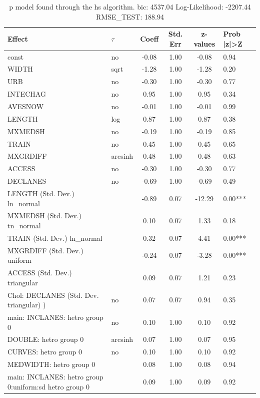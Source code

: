 \begin{table}
	\caption{p model found through the hs algorithm. bic: 4537.04 Log-Likelihood: -2207.44 RMSE_TEST: 188.94}
	\begin{center}
		\begin{tabular}{|l|l|c|c|c|l|}
			\hline
			Effect & $\tau$ & Coeff & Std. Err & z-values & Prob |z|>Z \\
			\hline
			const & no & -0.08 & 1.00 & -0.08 & 0.94 \\
			\hline
			WIDTH & sqrt & -1.28 & 1.00 & -1.28 & 0.20 \\
			\hline
			URB & no & -0.30 & 1.00 & -0.30 & 0.77 \\
			\hline
			INTECHAG & no & 0.95 & 1.00 & 0.95 & 0.34 \\
			\hline
			AVESNOW & no & -0.01 & 1.00 & -0.01 & 0.99 \\
			\hline
			LENGTH & log & 0.87 & 1.00 & 0.87 & 0.38 \\
			\hline
			MXMEDSH & no & -0.19 & 1.00 & -0.19 & 0.85 \\
			\hline
			TRAIN & no & 0.45 & 1.00 & 0.45 & 0.65 \\
			\hline
			MXGRDIFF & arcsinh & 0.48 & 1.00 & 0.48 & 0.63 \\
			\hline
			ACCESS & no & -0.30 & 1.00 & -0.30 & 0.77 \\
			\hline
			DECLANES & no & -0.69 & 1.00 & -0.69 & 0.49 \\
			\hline
			LENGTH (Std. Dev.) ln_normal &  & -0.89 & 0.07 & -12.29 & 0.00*** \\
			\hline
			MXMEDSH (Std. Dev.) tn_normal &  & 0.10 & 0.07 & 1.33 & 0.18 \\
			\hline
			TRAIN (Std. Dev.) ln_normal &  & 0.32 & 0.07 & 4.41 & 0.00*** \\
			\hline
			MXGRDIFF (Std. Dev.) uniform &  & -0.24 & 0.07 & -3.28 & 0.00*** \\
			\hline
			ACCESS (Std. Dev.) triangular &  & 0.09 & 0.07 & 1.21 & 0.23 \\
			\hline
			 Chol: DECLANES (Std. Dev. triangular) ) & no & 0.07 & 0.07 & 0.94 & 0.35 \\
			\hline
			main: INCLANES: hetro group 0 & no & 0.10 & 1.00 & 0.10 & 0.92 \\
			\hline
			DOUBLE: hetro group 0 & arcsinh & 0.07 & 1.00 & 0.07 & 0.95 \\
			\hline
			CURVES: hetro group 0 & no & 0.10 & 1.00 & 0.10 & 0.92 \\
			\hline
			MEDWIDTH: hetro group 0 &  & 0.08 & 1.00 & 0.08 & 0.94 \\
			\hline
			main: INCLANES: hetro group 0:uniform:sd  hetro group 0 &  & 0.09 & 1.00 & 0.09 & 0.92 \\
			\hline
		\end{tabular}
	\end{center}
\end{table}